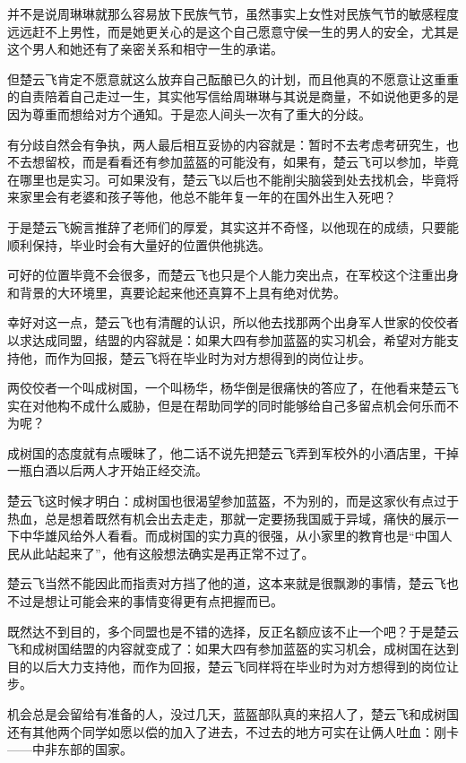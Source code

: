 并不是说周琳琳就那么容易放下民族气节，虽然事实上女性对民族气节的敏感程度远远赶不上男性，而是她更关心的是这个自己愿意守侯一生的男人的安全，尤其是这个男人和她还有了亲密关系和相守一生的承诺。

但楚云飞肯定不愿意就这么放弃自己酝酿已久的计划，而且他真的不愿意让这重重的自责陪着自己走过一生，其实他写信给周琳琳与其说是商量，不如说他更多的是因为尊重而想给对方个通知。于是恋人间头一次有了重大的分歧。

有分歧自然会有争执，两人最后相互妥协的内容就是：暂时不去考虑考研究生，也不去想留校，而是看看还有参加蓝盔的可能没有，如果有，楚云飞可以参加，毕竟在哪里也是实习。可如果没有，楚云飞以后也不能削尖脑袋到处去找机会，毕竟将来家里会有老婆和孩子等他，他总不能年复一年的在国外出生入死吧？

于是楚云飞婉言推辞了老师们的厚爱，其实这并不奇怪，以他现在的成绩，只要能顺利保持，毕业时会有大量好的位置供他挑选。

可好的位置毕竟不会很多，而楚云飞也只是个人能力突出点，在军校这个注重出身和背景的大环境里，真要论起来他还真算不上具有绝对优势。

幸好对这一点，楚云飞也有清醒的认识，所以他去找那两个出身军人世家的佼佼者以求达成同盟，结盟的内容就是：如果大四有参加蓝盔的实习机会，希望对方能支持他，而作为回报，楚云飞将在毕业时为对方想得到的岗位让步。

两佼佼者一个叫成树国，一个叫杨华，杨华倒是很痛快的答应了，在他看来楚云飞实在对他构不成什么威胁，但是在帮助同学的同时能够给自己多留点机会何乐而不为呢？

成树国的态度就有点暧昧了，他二话不说先把楚云飞弄到军校外的小酒店里，干掉一瓶白酒以后两人才开始正经交流。

楚云飞这时候才明白：成树国也很渴望参加蓝盔，不为别的，而是这家伙有点过于热血，总是想着既然有机会出去走走，那就一定要扬我国威于异域，痛快的展示一下中华雄风给外人看看。而成树国的实力真的很强，从小家里的教育也是“中国人民从此站起来了”，他有这般想法确实是再正常不过了。

楚云飞当然不能因此而指责对方挡了他的道，这本来就是很飘渺的事情，楚云飞也不过是想让可能会来的事情变得更有点把握而已。

既然达不到目的，多个同盟也是不错的选择，反正名额应该不止一个吧？于是楚云飞和成树国结盟的内容就变成了：如果大四有参加蓝盔的实习机会，成树国在达到目的以后大力支持他，而作为回报，楚云飞同样将在毕业时为对方想得到的岗位让步。

机会总是会留给有准备的人，没过几天，蓝盔部队真的来招人了，楚云飞和成树国还有其他两个同学如愿以偿的加入了进去，不过去的地方可实在让俩人吐血：刚卡——中非东部的国家。

